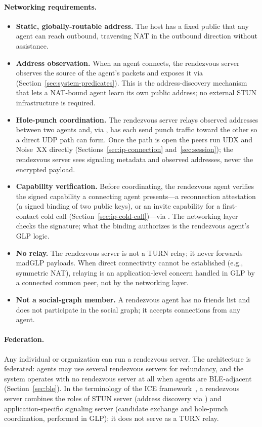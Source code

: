 \paragraph{Networking requirements.}
\begin{itemize}
\item \textbf{Static, globally-routable address.}  The host has a fixed public  that any agent can reach outbound, traversing NAT in the outbound direction without assistance.
\item \textbf{Address observation.}  When an agent connects, the rendezvous server observes the source  of the agent's packets and exposes it via  (Section~\ref{sec:system-predicates}).  This is the address-discovery mechanism that lets a NAT-bound agent learn its own public address; no external STUN infrastructure is required.
\item \textbf{Hole-punch coordination.}  The rendezvous server relays observed addresses between two agents and, via , has each send punch traffic toward the other so a direct UDP path can form.  Once the path is open the peers run UDX and Noise~XX directly (Sections~\ref{sec:ip-connection} and~\ref{sec:session}); the rendezvous server sees signaling metadata and observed addresses, never the encrypted payload.
\item \textbf{Capability verification.}  Before coordinating, the rendezvous agent verifies the signed capability a connecting agent presents---a reconnection attestation (a signed binding of two public keys), or an invite capability for a first-contact cold call (Section~\ref{sec:ip-cold-call})---via .  The networking layer checks the signature; what the binding authorizes is the rendezvous agent's GLP logic.
\item \textbf{No relay.}  The rendezvous server is not a TURN relay; it never forwards madGLP payloads.  When direct connectivity cannot be established (e.g., symmetric NAT), relaying is an application-level concern handled in GLP by a connected common peer, not by the networking layer.
\item \textbf{Not a social-graph member.}  A rendezvous agent has no friends list and does not participate in the social graph; it accepts connections from any agent.
\end{itemize}

\paragraph{Federation.}
Any individual or organization can run a rendezvous server.  The architecture is federated: agents may use several rendezvous servers for redundancy, and the system operates with no rendezvous server at all when agents are BLE-adjacent (Section~\ref{sec:ble}).  In the terminology of the ICE framework~\cite{rfc8445}, a rendezvous server combines the roles of STUN server (address discovery via ) and application-specific signaling server (candidate exchange and hole-punch coordination, performed in GLP); it does not serve as a TURN relay.
